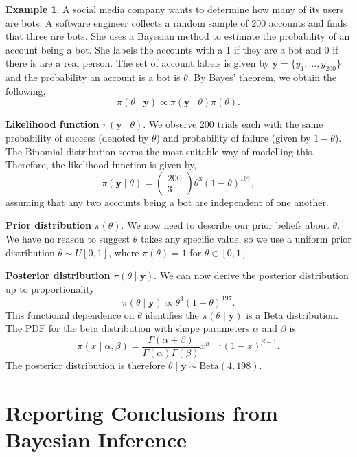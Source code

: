 \documentclass[
]{book}
\theoremstyle{definition}
\theoremstyle{definition}
\newtheorem{example}{Example}[chapter]
\theoremstyle{definition}
\theoremstyle{definition}
\theoremstyle{remark}
\begin{document}
\begin{example}
\protect\hypertarget{exm:binom}{}\label{exm:binom}A social media company wants to determine how many of its users are bots. A software engineer collects a random sample of 200 accounts and finds that three are bots. She uses a Bayesian method to estimate the probability of an account being a bot. She labels the accounts with a 1 if they are a bot and 0 if there is are a real person. The set of account labels is given by \(\boldsymbol{y} = \{y_1, \ldots, y_{200}\}\) and the probability an account is a bot is \(\theta\). By Bayes' theorem, we obtain the following,
\[
\pi(\theta \mid \boldsymbol{y}) \propto \pi(\boldsymbol{y}\mid \theta) \pi(\theta).
\]

\textbf{Likelihood function} \(\pi(\boldsymbol{y}\mid \theta)\). We observe 200 trials each with the same probability of success (denoted by \(\theta\)) and probability of failure (given by \(1-\theta\)). The Binomial distribution seems the most suitable way of modelling this. Therefore, the likelihood function is given by,
\[
\pi(\boldsymbol{y}\mid \theta) = \begin{pmatrix} 200 \\ 3 \end{pmatrix} \theta^3(1-\theta)^{197},
\]
assuming that any two accounts being a bot are independent of one another.

\textbf{Prior distribution} \(\pi(\theta)\). We now need to describe our prior beliefs about \(\theta\). We have no reason to suggest \(\theta\) takes any specific value, so we use a uniform prior distribution \(\theta \sim U[0, 1]\), where \(\pi(\theta) = 1\) for \(\theta \in [0, 1]\).

\textbf{Posterior distribution} \(\pi(\theta \mid \boldsymbol{y})\). We can now derive the posterior distribution up to proportionality
\[
\pi(\theta \mid \boldsymbol{y}) \propto \theta^3(1-\theta)^{197}. 
\]
This functional dependence on \(\theta\) identifies the \(\pi(\theta \mid \boldsymbol{y})\) is a Beta distribution. The PDF for the beta distribution with shape parameters \(\alpha\) and \(\beta\) is
\[
\pi(x \mid \alpha, \beta) = \frac{\Gamma(\alpha + \beta)}{\Gamma(\alpha)\Gamma(\beta)}x^{\alpha - 1}(1-x)^{\beta - 1}. 
\]
The posterior distribution is therefore \(\theta \mid \boldsymbol{y} \sim \textrm{Beta}(4, 198)\).
\end{example}

\hypertarget{reporting-conclusions-from-bayesian-inference}{%
\section{Reporting Conclusions from Bayesian Inference}\label{reporting-conclusions-from-bayesian-inference}}
\end{document}
